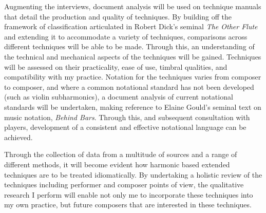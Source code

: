 Augmenting the interviews, document analysis will be used on technique manuals that detail the production and quality of techniques. 
By building off the framework of classification articulated in Robert Dick’s seminal \emph{The Other Flute} and extending it to accommodate a variety of techniques, comparisons across different techniques will be able to be made.\autocite{dickOtherFlute1989} 
Through this, an understanding of the technical and mechanical aspects of the techniques will be gained. Techniques will be assessed on their practicality, ease of use, timbral qualities, and compatibility with my practice. 
Notation for the techniques varies from composer to composer, and where a common notational standard has not been developed (such as violin subharmonics), a document analysis of current notational standards will be undertaken, making reference to Elaine Gould’s seminal text on music notation, \emph{Behind Bars}.\autocite{gouldBars2011} 
Through this, and subsequent consultation with players, development of a consistent and effective notational language can be achieved.

Through the collection of data from a multitude of sources and a range of different methods, it will become evident how harmonic based extended techniques are to be treated idiomatically. 
By undertaking a holistic review of the techniques including performer and composer points of view, the qualitative research I perform will enable not only me to incorporate these techniques into my own practice, but future composers that are interested in these techniques.





